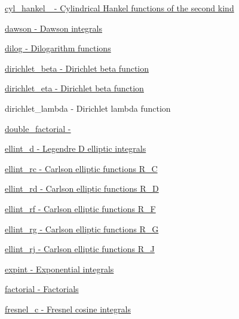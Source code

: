 \begin{DoxyItemize}
\item \hyperlink{group__gnu__math__spec__func_ga307fd77aa8f0ed2028a9fab88976ca54}{cyl\+\_\+hankel\+\_ -\/ Cylindrical Hankel functions of the second kind}
\item \hyperlink{group__gnu__math__spec__func_ga30e46cb24428cfdb858c52fec431dee4}{dawson -\/ Dawson integrals}
\item \hyperlink{group__gnu__math__spec__func_ga8fceba3ecc618971e0e3c089d8dc49cf}{dilog -\/ Dilogarithm functions}
\item \hyperlink{group__gnu__math__spec__func_ga87466a2d429a2815d794acc21c882b08}{dirichlet\+\_\+beta -\/ Dirichlet beta function}
\item \hyperlink{group__gnu__math__spec__func_gae46e26e4107675d285c79a2d6202e6c7}{dirichlet\+\_\+eta -\/ Dirichlet beta function}
\item dirichlet\+\_\+lambda -\/ Dirichlet lambda function
\item \hyperlink{group__gnu__math__spec__func_ga206cdf1ae7f9a0df3048af18892b8ba8}{double\+\_\+factorial -\/ }
\item \hyperlink{group__gnu__math__spec__func_ga6a594ffefbe4f238f98fa2190b03795f}{ellint\+\_\+d -\/ Legendre D elliptic integrals}
\item \hyperlink{group__gnu__math__spec__func_ga183d78859b56f93237567e6322164832}{ellint\+\_\+rc -\/ Carlson elliptic functions R\+\_\+C}
\item \hyperlink{group__gnu__math__spec__func_ga812c4f543575006c6b555d1385b88d90}{ellint\+\_\+rd -\/ Carlson elliptic functions R\+\_\+D}
\item \hyperlink{group__gnu__math__spec__func_gad276bd7533a87ca6d658cebc00a11b0a}{ellint\+\_\+rf -\/ Carlson elliptic functions R\+\_\+F}
\item \hyperlink{group__gnu__math__spec__func_ga9d3d53ace67dfa6126118fb780095a1f}{ellint\+\_\+rg -\/ Carlson elliptic functions R\+\_\+G}
\item \hyperlink{group__gnu__math__spec__func_ga61c6d7f5b930400eeb8de455667d4292}{ellint\+\_\+rj -\/ Carlson elliptic functions R\+\_\+J}
\item \hyperlink{group__gnu__math__spec__func_ga9f04033823155e7690779d432d9f1922}{expint -\/ Exponential integrals}
\item \hyperlink{group__gnu__math__spec__func_gafdb75898f433c95eec50d8effbf94fb4}{factorial -\/ Factorials}
\item \hyperlink{group__gnu__math__spec__func_ga7ecb0071ad3172d53276a967f9b702fc}{fresnel\+\_\+c -\/ Fresnel cosine integrals}

\end{DoxyItemize}

